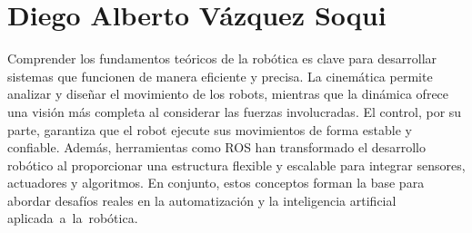 \section{Diego Alberto Vázquez Soqui}
Comprender los fundamentos teóricos de la robótica es clave para desarrollar sistemas que funcionen de manera eficiente y precisa. La cinemática permite analizar y diseñar el movimiento de los robots, mientras que la dinámica ofrece una visión más completa al considerar las fuerzas involucradas. El control, por su parte, garantiza que el robot ejecute sus movimientos de forma estable y confiable. Además, herramientas como ROS han transformado el desarrollo robótico al proporcionar una estructura flexible y escalable para integrar sensores, actuadores y algoritmos. En conjunto, estos conceptos forman la base para abordar desafíos reales en la automatización y la inteligencia artificial aplicada a la robótica.